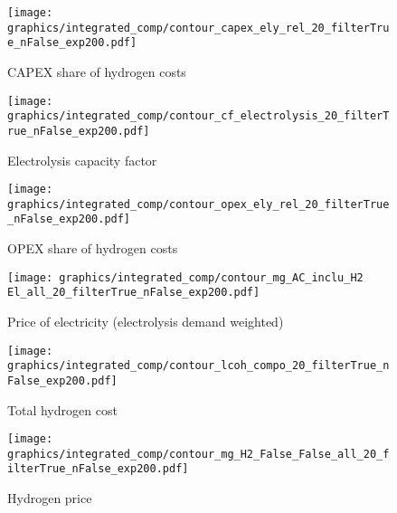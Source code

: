 \begin{figure*}[h!]
    \centering
    \begin{subfigure}[b]{0.45\linewidth}
        \centering
        \texttt{[image: graphics/integrated\_comp/contour\_capex\_ely\_rel\_20\_filterTrue\_nFalse\_exp200.pdf]}
        \caption{CAPEX share of hydrogen costs}
        \label{fig:capex-rel-hourly}
    \end{subfigure}
    \hfill
    \begin{subfigure}[b]{0.45\linewidth}
        \centering
        \texttt{[image: graphics/integrated\_comp/contour\_cf\_electrolysis\_20\_filterTrue\_nFalse\_exp200.pdf]}
        \caption{Electrolysis capacity factor}
        \label{fig:ely-cf-hourly}
    \end{subfigure}
    \hfill
    \begin{subfigure}[b]{0.45\linewidth}
        \centering
        \texttt{[image: graphics/integrated\_comp/contour\_opex\_ely\_rel\_20\_filterTrue\_nFalse\_exp200.pdf]}
        \caption{OPEX share of hydrogen costs}
        \label{fig:opex-rel-hourly}
    \end{subfigure}
    \hfill
    \begin{subfigure}[b]{0.45\linewidth}
        \centering
        \texttt{[image: graphics/integrated\_comp/contour\_mg\_AC\_inclu\_H2 El\_all\_20\_filterTrue\_nFalse\_exp200.pdf]}
        \caption{Price of electricity (electrolysis demand weighted)}
        \label{fig:electricity-price-hourly}
    \end{subfigure}
    \hfill
    \begin{subfigure}[b]{0.45\linewidth}
        \centering
        \texttt{[image: graphics/integrated\_comp/contour\_lcoh\_compo\_20\_filterTrue\_nFalse\_exp200.pdf]}
        \caption{Total hydrogen cost}
        \label{fig:hydrogen-cost-hourly}
    \end{subfigure}
    \hfill
    \begin{subfigure}[b]{0.45\linewidth}
        \centering
        \texttt{[image: graphics/integrated\_comp/contour\_mg\_H2\_False\_False\_all\_20\_filterTrue\_nFalse\_exp200.pdf]}
        \caption{Hydrogen price}
        \label{fig:hydrogen-price-hourly}
    \end{subfigure}
    \hfill
    
    \caption{Cost components of hydrogen electrolysis and the respective main influence factors on it {\bf with} hourly temporal matching. The CAPEX (\ref{fig:capex-rel-hourly}) depends on the electrolysis capacity factor (\ref{fig:ely-cf-hourly}), whereas the OPEX (\ref{fig:opex-rel-hourly}) is influenced by the price of electricity for electrolysis (\ref{fig:electricity-price-hourly}). With temporal hydrogen regulation, the cost of hydrogen  (\ref{fig:hydrogen-cost-hourly}) is not reflected by the price of hydrogen (\ref{fig:hydrogen-price-hourly}), which includes the additional constraint of hourly matching and hence the installation of RE and storage capacities.}
    \label{fig:costbreakdown_hourly}
\end{figure*}


